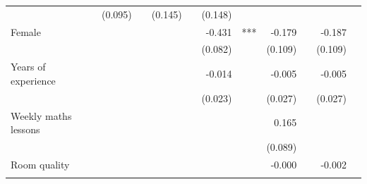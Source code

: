 \documentclass{article}
\begin{document}
\begin{table}[!h]
\begin{tabular}{lllllllllll}
  \multicolumn{1}{l}{} &
  \multicolumn{1}{r}{(0.095)} &
  \multicolumn{1}{l}{} &
  \multicolumn{1}{r}{(0.145)} &
  \multicolumn{1}{l}{} &
  \multicolumn{1}{r}{(0.148)} &
  \multicolumn{1}{l}{} \\
\multicolumn{1}{l}{Female} &
  \multicolumn{1}{r}{} &
  \multicolumn{1}{l}{} &
  \multicolumn{1}{r}{} &
  \multicolumn{1}{l}{} &
  \multicolumn{1}{r}{-0.431} &
  \multicolumn{1}{l}{***} &
  \multicolumn{1}{r}{-0.179} &
  \multicolumn{1}{l}{} &
  \multicolumn{1}{r}{-0.187} &
  \multicolumn{1}{l}{} \\
\multicolumn{1}{l}{} &
  \multicolumn{1}{r}{} &
  \multicolumn{1}{l}{} &
  \multicolumn{1}{r}{} &
  \multicolumn{1}{l}{} &
  \multicolumn{1}{r}{(0.082)} &
  \multicolumn{1}{l}{} &
  \multicolumn{1}{r}{(0.109)} &
  \multicolumn{1}{l}{} &
  \multicolumn{1}{r}{(0.109)} &
  \multicolumn{1}{l}{} \\
\multicolumn{1}{l}{Years of experience} &
  \multicolumn{1}{r}{} &
  \multicolumn{1}{l}{} &
  \multicolumn{1}{r}{} &
  \multicolumn{1}{l}{} &
  \multicolumn{1}{r}{-0.014} &
  \multicolumn{1}{l}{} &
  \multicolumn{1}{r}{-0.005} &
  \multicolumn{1}{l}{} &
  \multicolumn{1}{r}{-0.005} &
  \multicolumn{1}{l}{} \\
\multicolumn{1}{l}{} &
  \multicolumn{1}{r}{} &
  \multicolumn{1}{l}{} &
  \multicolumn{1}{r}{} &
  \multicolumn{1}{l}{} &
  \multicolumn{1}{r}{(0.023)} &
  \multicolumn{1}{l}{} &
  \multicolumn{1}{r}{(0.027)} &
  \multicolumn{1}{l}{} &
  \multicolumn{1}{r}{(0.027)} &
  \multicolumn{1}{l}{} \\
\multicolumn{1}{l}{Weekly maths lessons} &
  \multicolumn{1}{r}{} &
  \multicolumn{1}{l}{} &
  \multicolumn{1}{r}{} &
  \multicolumn{1}{l}{} &
  \multicolumn{1}{r}{} &
  \multicolumn{1}{l}{} &
  \multicolumn{1}{r}{0.165} &
  \multicolumn{1}{l}{} &
  \multicolumn{1}{r}{} &
  \multicolumn{1}{l}{} \\
\multicolumn{1}{l}{} &
  \multicolumn{1}{r}{} &
  \multicolumn{1}{l}{} &
  \multicolumn{1}{r}{} &
  \multicolumn{1}{l}{} &
  \multicolumn{1}{r}{} &
  \multicolumn{1}{l}{} &
  \multicolumn{1}{r}{(0.089)} &
  \multicolumn{1}{l}{} &
  \multicolumn{1}{r}{} &
  \multicolumn{1}{l}{} \\
\multicolumn{1}{l}{Room quality} &
  \multicolumn{1}{r}{} &
  \multicolumn{1}{l}{} &
  \multicolumn{1}{r}{} &
  \multicolumn{1}{l}{} &
  \multicolumn{1}{r}{} &
  \multicolumn{1}{l}{} &
  \multicolumn{1}{r}{-0.000} &
  \multicolumn{1}{l}{} &
  \multicolumn{1}{r}{-0.002} &
  \multicolumn{1}{l}{} \\
\multicolumn{1}{l}{} &

\end{tabular}
\end{table}
\end{document}
